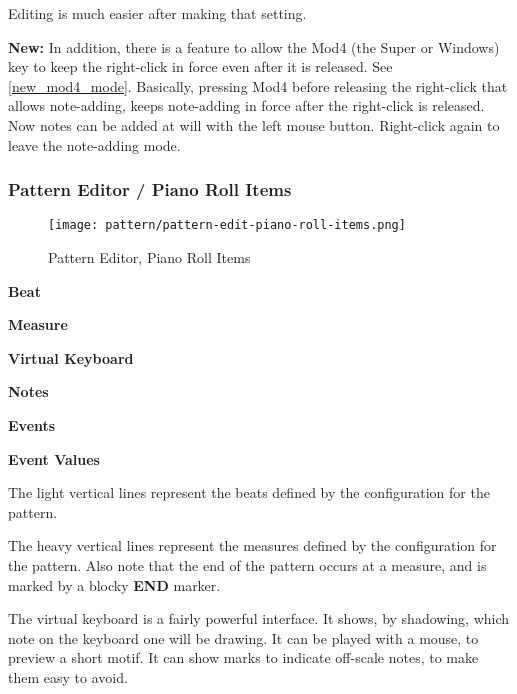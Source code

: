    Editing is much easier after making that setting.
   
   \textbf{New:} In addition, there
   is a feature to allow the Mod4 (the Super or Windows) key to keep
   the right-click in force even after it is released.  See
   \ref{new_mod4_mode}.  Basically, pressing Mod4 before releasing the
   right-click that allows note-adding, keeps note-adding in force after the
   right-click is released.  Now notes can be added at will with the
   left mouse button.  Right-click again to leave the note-adding mode.

\subsubsection{Pattern Editor / Piano Roll Items}
\label{subsubsec:seq24_pattern_editor_piano_roll_items}

\begin{figure}[H]
   \centering 
   \texttt{[image: pattern/pattern-edit-piano-roll-items.png]}
   \caption{Pattern Editor, Piano Roll Items}
   \label{fig:pattern_editor_piano_roll_items}
\end{figure}

   \begin{enumber}
      \item \textbf{Beat}
      \item \textbf{Measure}
      \item \textbf{Virtual Keyboard}
      \item \textbf{Notes}
      \item \textbf{Events}
      \item \textbf{Event Values}
   \end{enumber}

   \setcounter{ItemCounter}{0}      %

   The light vertical lines represent the beats defined by the configuration
   for the pattern.

   The heavy vertical lines represent the measures defined by the
   configuration for the pattern.
   Also note that the end of the pattern
   occurs at a measure, and is marked by a blocky \textbf{END} marker.

   The virtual keyboard is a fairly powerful interface.  It shows,
   by shadowing, which note on the keyboard one will be drawing. It can be
   played with a mouse, to preview a short motif.
   It can show marks to indicate off-scale notes, to make them easy to
   avoid.

